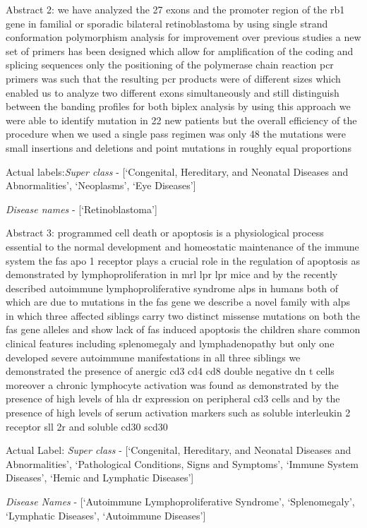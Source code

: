 \begin{boxet}
Abstract 2: \textsf{we have analyzed the 27 exons and the promoter region of the rb1 gene in familial or sporadic bilateral retinoblastoma by using single strand conformation polymorphism analysis for improvement over previous studies a new set of primers has been designed which allow for amplification of the coding and splicing sequences only the positioning of the polymerase chain reaction pcr primers was such that the resulting pcr products were of different sizes which enabled us to analyze two different exons simultaneously and still distinguish between the banding profiles for both biplex analysis by using this approach we were able to identify mutation in 22 new patients but the overall efficiency of the procedure when we used a single pass regimen was only 48 the mutations were small insertions and deletions and point mutations in roughly equal proportions}

Actual labels:\emph{Super class} -  [`Congenital, Hereditary, and Neonatal Diseases and Abnormalities', `Neoplasms', `Eye Diseases']

\emph{Disease names} - [`Retinoblastoma']
\end{boxet}
\begin{boxet}
Abstract 3: \textsf{programmed cell death or apoptosis is a physiological process essential to the normal development and homeostatic maintenance of the immune system the fas apo 1 receptor plays a crucial role in the regulation of apoptosis as demonstrated by lymphoproliferation in mrl lpr lpr mice and by the recently described autoimmune lymphoproliferative syndrome alps in humans both of which are due to mutations in the fas gene we describe a novel family with alps in which three affected siblings carry two distinct missense mutations on both the fas gene alleles and show lack of fas induced apoptosis the children share common clinical features including splenomegaly and lymphadenopathy but only one developed severe autoimmune manifestations in all three siblings we demonstrated the presence of anergic cd3 cd4 cd8 double negative dn t cells moreover a chronic lymphocyte activation was found as demonstrated by the presence of high levels of hla dr expression on peripheral cd3 cells and by the presence of high levels of serum activation markers such as soluble interleukin 2 receptor sll 2r and soluble cd30 scd30}

Actual Label: \emph{Super class} - [`Congenital, Hereditary, and Neonatal Diseases and Abnormalities', `Pathological Conditions, Signs and Symptoms', `Immune System Diseases', `Hemic and Lymphatic Diseases']

\emph{Disease Names} - [`Autoimmune Lymphoproliferative Syndrome', `Splenomegaly', `Lymphatic Diseases', `Autoimmune Diseases']

\end{boxet}

